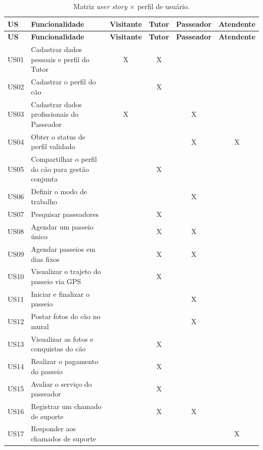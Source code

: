 \begin{footnotesize}
\setlength{\tabcolsep}{4pt}
\begin{longtable}{|p{1cm}|p{5cm}|c|c|c|c|}
	\caption{Matriz \textit{user story} $\times$ perfil de usuário.}
	\label{tabela-matriz-us-perfil}\\\hline
	\rowcolor{lightgray}
	\textbf{US} & \textbf{Funcionalidade} & \textbf{Visitante} & \textbf{Tutor} & \textbf{Passeador} & \textbf{Atendente} \\\hline
	\endfirsthead
	\hline
	\rowcolor{lightgray}
	\textbf{US} & \textbf{Funcionalidade} & \textbf{Visitante} & \textbf{Tutor} & \textbf{Passeador} & \textbf{Atendente} \\\hline
	\endhead
	US01 & Cadastrar dados pessoais e perfil do Tutor & X & X & & \\\hline
	US02 & Cadastrar o perfil do cão & & X & & \\\hline
	US03 & Cadastrar dados profissionais do Passeador & X & & X & \\\hline
	US04 & Obter o status de perfil validado & & & X & X \\\hline
	US05 & Compartilhar o perfil do cão para gestão conjunta & & X & & \\\hline
	US06 & Definir o modo de trabalho & & & X & \\\hline
	US07 & Pesquisar passeadores & & X & & \\\hline
	US08 & Agendar um passeio único & & X & X & \\\hline
	US09 & Agendar passeios em dias fixos & & X & X & \\\hline
	US10 & Visualizar o trajeto do passeio via GPS & & X & & \\\hline
	US11 & Iniciar e finalizar o passeio & & & X & \\\hline
	US12 & Postar fotos do cão no mural & & & X & \\\hline
	US13 & Visualizar as fotos e conquistas do cão & & X & & \\\hline
	US14 & Realizar o pagamento do passeio & & X & & \\\hline
	US15 & Avaliar o serviço do passeador & & X & & \\\hline
	US16 & Registrar um chamado de suporte & & X & X & \\\hline
	US17 & Responder aos chamados de suporte & & & & X \\\hline
\end{longtable}
\end{footnotesize}

